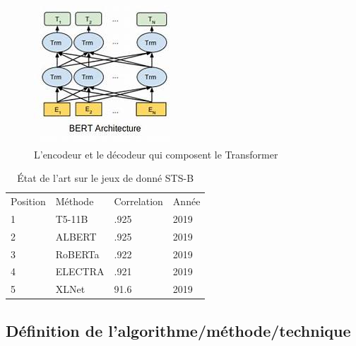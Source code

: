 \documentclass[11pt,a4paper, french]{article}
\begin{document}
\begin{figure}
	\includegraphics[width=\linewidth]{bert.jpg}
	\caption{L'encodeur et le décodeur qui composent le Transformer}
	
\end{figure} 
	
	\begin{table}[]
		\begin{tabular}{llll}
			\hline
			Position & Méthode & Correlation & Année \\
			1        & T5-11B  & .925                 & 2019  \\
			2        & ALBERT  & .925                 & 2019  \\
			3        & RoBERTa & .922                 & 2019  \\
			4        & ELECTRA & .921                 & 2019  \\
			5        & XLNet   & 91.6                 & 2019 
		\end{tabular}
	  \caption{État de l'art sur le jeux de donné STS-B}
	\end{table}



\subsection{Définition de l'algorithme/méthode/technique}
\end{document}
